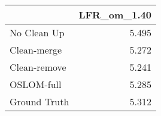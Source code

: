 \begin{tabular}{lr}
\toprule
{} & LFR_om_1.40 \\
\midrule
No Clean Up  &       5.495 \\
Clean-merge  &       5.272 \\
Clean-remove &       5.241 \\
OSLOM-full   &       5.285 \\
Ground Truth &       5.312 \\
\bottomrule
\end{tabular}
